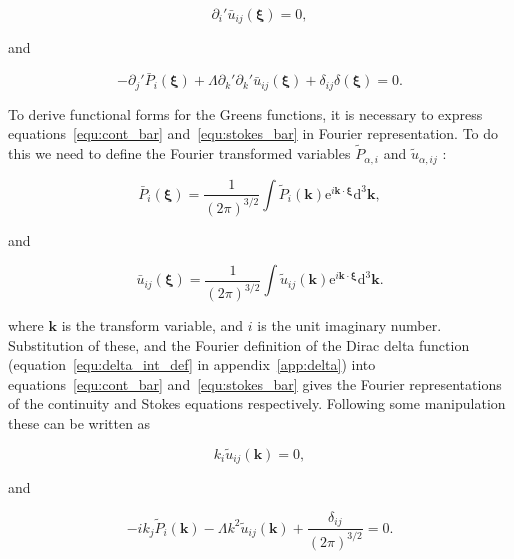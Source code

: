 \documentclass[12pt]{article}
\begin{document}
\begin{equation}
\label{equ:cont_bar}
\partial_{i}' \bar{u}_{ij} (\boldsymbol\xi)  = 0 ,
\end{equation}

and

\begin{equation}
\label{equ:stokes_bar}
-\partial_{j}' \bar{P}_{i} (\boldsymbol\xi) + \Lambda \partial_{k}' \partial_{k}' \bar{u}_{ij} (\boldsymbol\xi) + \delta_{ij} \delta(\boldsymbol\xi) = 0 .
\end{equation}

To derive functional forms for the Greens functions, it is necessary to express equations~\ref{equ:cont_bar} and~\ref{equ:stokes_bar} in Fourier representation. To do this we need to define the Fourier transformed variables $\tilde{P}_{\alpha, i}$ and $\tilde{u}_{\alpha,ij}$ \citep{Riley06}:

\begin{equation}
\label{equ:fourier_p}
\bar{P}_{i} (\boldsymbol\xi) = \frac{1}{(2 \pi)^{3/2}} \int \tilde{P}_{i} (\boldsymbol{k}) \mathrm{e}^{i \boldsymbol{k} \cdot \boldsymbol\xi} \mathrm{d}^{3} \boldsymbol{k} ,
\end{equation}

and 

\begin{equation}
\label{equ:fourier_vel}
\bar{u}_{ij} (\boldsymbol\xi) = \frac{1}{(2 \pi)^{3/2}} \int \tilde{u}_{ij} (\boldsymbol{k}) \mathrm{e}^{i \boldsymbol{k} \cdot \boldsymbol\xi} \mathrm{d}^{3} \boldsymbol{k} .
\end{equation}


where $\boldsymbol{k}$ is the transform variable, and $i$ is the unit imaginary number. Substitution of these, and the Fourier definition of the Dirac delta function (equation~\ref{equ:delta_int_def} in appendix~\ref{app:delta}) into equations~\ref{equ:cont_bar} and~\ref{equ:stokes_bar} gives the Fourier representations of the continuity and Stokes equations respectively. Following some manipulation these can be written as

\begin{equation}
\label{equ:fourier_cont}
k_{i} \tilde{u}_{ij} (\boldsymbol{k}) = 0 ,
\end{equation}

and

\begin{equation}
\label{equ:fourier_stokes}
-i k_{j} \tilde{P}_{i} (\boldsymbol{k}) - \Lambda k^{2} \tilde{u}_{ij} (\boldsymbol{k}) + \frac{\delta_{ij}}{(2 \pi)^{3/2}} = 0 .
\end{equation}
\end{document}
